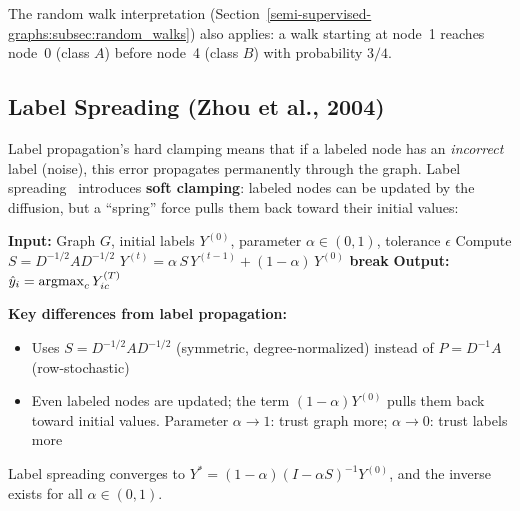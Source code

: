 \begin{notechapter}
\begin{example}
The random walk interpretation (Section~\ref{semi-supervised-graphs:subsec:random_walks}) also
applies: a walk starting at node~1 reaches node~0 (class $A$) before node~4
(class $B$) with probability $3/4$.
\end{example}

\subsection{Label Spreading (Zhou et al., 2004)}
\label{semi-supervised-graphs:subsec:ls}

Label propagation's hard clamping means that if a labeled node has an
\emph{incorrect} label (noise), this error propagates permanently through the
graph. Label spreading~\cite{semi-supervised-graphs:zhou2004} introduces \textbf{soft clamping}:
labeled nodes can be updated by the diffusion, but a ``spring'' force pulls
them back toward their initial values:

\begin{algorithm}[H]
\caption{Label Spreading~\cite{semi-supervised-graphs:zhou2004}}
\begin{algorithmic}[1]
\State \textbf{Input:} Graph $G$, initial labels $Y^{(0)}$, parameter
      $\alpha \in (0,1)$, tolerance $\epsilon$
\State Compute $S = D^{-1/2}AD^{-1/2}$
    \State $Y^{(t)} = \alpha\, S\, Y^{(t-1)} + (1-\alpha)\, Y^{(0)}$
     \textbf{break} \EndIf
\EndFor
\State \textbf{Output:} $\hat{y}_i = \operatorname*{argmax}_c Y_{ic}^{(T)}$
\end{algorithmic}
\end{algorithm}

\noindent \textbf{Key differences from label propagation:}
\begin{itemize}
    \item Uses $S = D^{-1/2}AD^{-1/2}$ (symmetric, degree-normalized)
    instead of $P = D^{-1}A$ (row-stochastic)
    \item Even labeled nodes are updated; the term $(1{-}\alpha)Y^{(0)}$
    pulls them back toward initial values. Parameter $\alpha \to 1$:
    trust graph more; $\alpha \to 0$: trust labels more
\end{itemize}

\begin{theorem}
\label{semi-supervised-graphs:thm:ls_closed}
Label spreading converges to $Y^* = (1-\alpha)(I - \alpha S)^{-1}Y^{(0)}$, and
the inverse exists for all $\alpha \in (0,1)$.
\end{theorem}


\end{notechapter}
